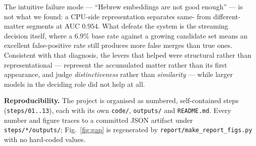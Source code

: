 \documentclass[10pt,a4paper,twocolumn]{article}
\begin{document}
The intuitive failure mode --- ``Hebrew embeddings are not good enough'' --- is not what we
found: a CPU-side representation separates same- from different-matter segments at AUC $0.954$.
What defeats the system is the streaming decision itself, where a $6.9\%$ base rate against a
growing candidate set means an excellent false-positive rate still produces more false merges
than true ones. Consistent with that diagnosis, the levers that helped were structural rather
than representational --- represent the accumulated matter rather than its first appearance,
and judge \emph{distinctiveness} rather than \emph{similarity} --- while larger models in the
deciding role did not help at all.

\vspace{2pt}
{\footnotesize\noindent\textbf{Reproducibility.} The project is organised as numbered,
self-contained steps (\texttt{steps/01..13}), each with its own \texttt{code/},
\texttt{outputs/} and \texttt{README.md}. Every number and figure traces to a committed JSON
artifact under \texttt{steps/*/outputs/}; Fig.~\ref{fig:gap} is regenerated by
\texttt{report/make\_report\_figs.py} with no hard-coded values.}
\end{document}
